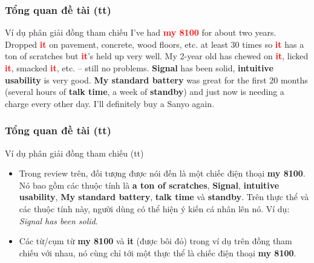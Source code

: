 \documentclass{beamer}
\begin{document}
	\begin{frame}
		\frametitle{Tổng quan đề tài (tt)}
		\begin{block}{Ví dụ phân giải đồng tham chiếu}			
			I've had \textbf{\textcolor{red}{my 8100}} for about two years.  Dropped \textbf{\textcolor{red}{it}} on pavement, concrete, wood floors, etc. at least 30 times so \textbf{\textcolor{red}{it}} has a ton of scratches but \textbf{\textcolor{red}{it}}'s held up very well.  My 2-year old has chewed on \textbf{\textcolor{red}{it}}, licked \textbf{\textcolor{red}{it}}, smacked \textbf{\textcolor{red}{it}}, etc. -- still no problems.  \textbf{Signal} has been solid, \textbf{intuitive usability} is very good.  \textbf{My standard battery} was great for the first 20 months (several hours of \textbf{talk time}, a week of \textbf{standby}) and just now is needing a charge every other day. I'll definitely buy a Sanyo again.
		\end{block}
	\end{frame}

	\begin{frame}
		\frametitle{Tổng quan đề tài (tt)}
		\begin{block}{Ví dụ phân giải đồng tham chiếu (tt)}
			\begin{itemize}
				\item{Trong review trên, đối tượng được nói đến là một chiếc điện thoại \textbf{my 8100}. Nó bao gồm các thuộc tính là \textbf{a ton of scratches}, \textbf{Signal}, \textbf{intuitive usability}, \textbf{My standard battery}, \textbf{talk time} và \textbf{standby}. Trên thực thể và các thuộc tính này, người dùng có thể hiện ý kiến cá nhân lên nó. Ví dụ: \textit{Signal has been solid}. 		}
				\item{Các từ/cụm từ \textbf{my 8100} và \textbf{it} (được bôi đỏ) trong ví dụ trên đồng tham chiếu với nhau, nó cùng chỉ tới một thực thể là chiếc điện thoại \textbf{my 8100}.}
			\end{itemize}			
		\end{block}		
	\end{frame}
\end{document}
